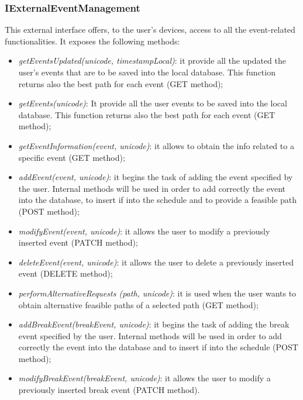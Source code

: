 \subsubsection{IExternalEventManagement}
This external interface offers, to the user's devices, access to all the event-related functionalities. It exposes the following methods:
\begin{itemize}
\item \textit{getEventsUpdated(unicode, timestampLocal)}: it provide all the updated the user's events that are to be saved into the local database. This function returns also the best path for each event (GET method);
\item \textit{getEvents(unicode)}: It provide all the user events to be saved into the local database. This function returns also the best path for each event (GET method);
\item \textit{getEventInformation(event, unicode)}: it allows to obtain the info related to a specific event (GET method);
\item \textit{addEvent(event, unicode)}: it begins the task of adding the event specified by the user. Internal methods will be used in order to add correctly the event into the database, to insert if into the schedule and to provide a feasible path (POST method);
\item \textit{modifyEvent(event, unicode)}: it allows the user to modify a previously inserted event (PATCH method);
\item \textit{deleteEvent(event, unicode)}: it allows the user to delete a previously inserted event (DELETE method);
\item \textit{performAlternativeRequests (path, unicode)}: it is used when the user wants to obtain alternative feasible paths of a selected path (GET method);
\item \textit{addBreakEvent(breakEvent, unicode)}: it begins the task of adding the break event specified by the user. Internal methods will be used in order to add correctly the event into the database and to insert if into the schedule (POST method);
\item \textit{modifyBreakEvent(breakEvent, unicode)}: it allows the user to modify a previously inserted break event (PATCH method).
\end{itemize}


